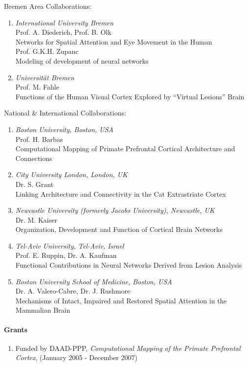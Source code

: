 %
Bremen Area Collaborations:
\begin{enumerate}
\item {\sl International University Bremen }\\Prof. A. Diederich, Prof. B. Olk\\Networks for Spatial Attention and Eye Movement in the Human
\\ Prof. G.K.H. Zupanc \\ Modeling of development of neural networks
\item {\sl Universit\"{a}t Bremen}\\Prof. M. Fahle\\Functions
of the Human Visual Cortex Explored by ``Virtual Lesions''
Brain

\end{enumerate}
National \& International Collaborations:
\begin{enumerate}
\item {\sl Boston University, Boston, USA}\\Prof. H. Barbas\\Computational
Mapping of Primate Prefrontal Cortical Architecture and Connections
\item {\sl City University London, London, UK}\\Dr. S. Grant\\Linking
Architecture and Connectivity in the Cat Extrastriate Cortex
\item {\sl Newcastle University (formerly Jacobs University), Newcastle, UK}\\Dr. M.
Kaiser\\Organization, Development and Function of Cortical Brain
Networks
\item {\sl Tel-Aviv University, Tel-Aviv, Israel}\\Prof. E. Ruppin, Dr. A.
Kaufman\\Functional Contributions in Neural Networks Derived from
Lesion Analysis
\item {\sl Boston University School of Medicine, Boston, USA}\\Dr. A. Valero-Cabre, Dr. J.
Rushmore\\Mechanisms of Intact, Impaired and Restored Spatial
Attention in the Mammalian Brain
\end{enumerate}

\paragraph{Grants}
\begin{enumerate}
\item Funded by DAAD-PPP, \emph{Computational Mapping of the
Primate Prefrontal Cortex},  (January 2005 - December 2007)
\end{enumerate}

